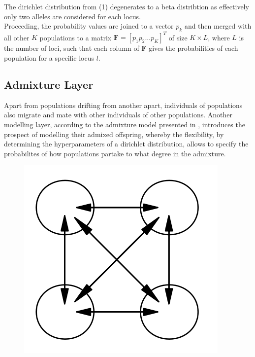 \documentclass[a4paper, 11pt]{article}
\begin{document}
The dirichlet distribution from (1) degenerates to a beta distribtion as effectively only two alleles are considered for each locus. \\

Proceeding, the probability values are joined to a vector $p_k$ and then merged with all other $K$ populations to a matrix $\mathbf{F} = [p_1 p_2 \ldots p_K]^T$ of size $K \times L$, where $L$ is the number of loci, such that each column of $\mathbf{F}$ gives the probabilities of each population for a specific locus $l$. \\

\subsection{Admixture Layer}

Apart from populations drifting from another apart, individuals of populations also migrate and mate with other individuals of other populations. Another modelling layer, according to the admixture model presented in \cite{pritchard2000inference}, introduces the prospect of modelling their admixed offspring, whereby the flexibility, by determining the hyperparameters of a dirichlet distribution, allows to specify the probabilites of how populations partake to what degree in the admixture.

\begin{figure}
\includegraphics[scale=0.5]{level_2}
\end{figure}
\end{document}
